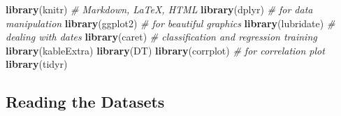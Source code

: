 \documentclass[]{article}
\newenvironment{Shaded}{\begin{snugshade}}{\end{snugshade}}
\newcommand{\KeywordTok}[1]{\textcolor[rgb]{0.13,0.29,0.53}{\textbf{#1}}}
\newcommand{\DataTypeTok}[1]{\textcolor[rgb]{0.13,0.29,0.53}{#1}}
\newcommand{\DecValTok}[1]{\textcolor[rgb]{0.00,0.00,0.81}{#1}}
\newcommand{\StringTok}[1]{\textcolor[rgb]{0.31,0.60,0.02}{#1}}
\newcommand{\CommentTok}[1]{\textcolor[rgb]{0.56,0.35,0.01}{\textit{#1}}}
\newcommand{\OperatorTok}[1]{\textcolor[rgb]{0.81,0.36,0.00}{\textbf{#1}}}
\newcommand{\NormalTok}[1]{#1}
\begin{document}
\begin{Shaded}
\begin{Highlighting}[]
\KeywordTok{library}\NormalTok{(knitr) }\CommentTok{# Markdown, LaTeX, HTML}
\KeywordTok{library}\NormalTok{(dplyr) }\CommentTok{# for data manipulation}
\KeywordTok{library}\NormalTok{(ggplot2) }\CommentTok{# for beautiful graphics}
\KeywordTok{library}\NormalTok{(lubridate) }\CommentTok{# dealing with dates}
\KeywordTok{library}\NormalTok{(caret) }\CommentTok{# classification and regression training}
\KeywordTok{library}\NormalTok{(kableExtra)}
\KeywordTok{library}\NormalTok{(DT)}
\KeywordTok{library}\NormalTok{(corrplot) }\CommentTok{# for correlation plot}
\KeywordTok{library}\NormalTok{(tidyr) }
\end{Highlighting}
\end{Shaded}

\hypertarget{reading-the-datasets}{\subsection{Reading the
Datasets}\label{reading-the-datasets}}

\begin{Shaded}
\end{Shaded}
\end{document}
